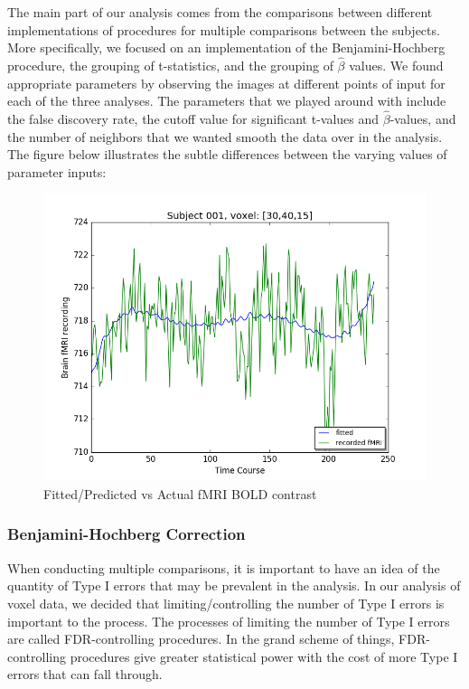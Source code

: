 \par The main part of our analysis comes from the comparisons between different 
implementations of procedures for multiple comparisons between the subjects.
More specifically, we focused on an implementation of the Benjamini-Hochberg 
procedure, the grouping of t-statistics, and the grouping of $\hat{\beta}$ 
values. We found appropriate parameters by observing the images at different 
points of input for each of the three analyses. The parameters that we played 
around with include the false discovery rate, the cutoff value for significant 
t-values and $\hat{\beta}$-values, and the number of neighbors that we wanted 
smooth the data over in the analysis. The figure below illustrates the subtle
differences between the varying values of parameter inputs:

\begin{figure}[ht]

	\centering
	\includegraphics[width=.8\linewidth]{../images/Fitted_v_Actual.png} 
	\caption{Fitted/Predicted vs Actual fMRI BOLD contrast}
	\label{fig:fit_vs_act}

\end{figure}

\subsubsection{Benjamini-Hochberg Correction}

\par When conducting multiple comparisons, it is important to have an 
idea of the quantity of Type I errors that may be prevalent in the analysis. 
In our analysis of voxel data, we decided that limiting/controlling the number 
of Type I errors is important to the process. The processes of limiting the 
number of Type I errors are called FDR-controlling procedures. In the grand 
scheme of things, FDR-controlling procedures give greater statistical power 
with the cost of more Type I errors that can fall through. 

